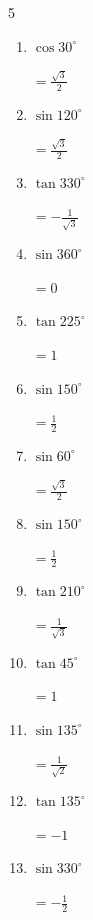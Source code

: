 \begin{multicols}{5}
\begin{enumerate}
  \item $\displaystyle \cos{30^\circ}$

        $\displaystyle =\frac{\sqrt{3}}{2}$

  \item $\displaystyle \sin{120^\circ}$

        $\displaystyle =\frac{\sqrt{3}}{2}$

  \item $\displaystyle \tan{330^\circ}$

        $\displaystyle =-\frac{1}{\sqrt{3}}$

  \item $\displaystyle \sin{360^\circ}$

        $\displaystyle =0$

  \item $\displaystyle \tan{225^\circ}$

        $\displaystyle =1$

\columnbreak %

  \item $\displaystyle \sin{150^\circ}$

        $\displaystyle =\frac{1}{2}$

  \item $\displaystyle \sin{60^\circ}$

        $\displaystyle =\frac{\sqrt{3}}{2}$

  \item $\displaystyle \sin{150^\circ}$

        $\displaystyle =\frac{1}{2}$

  \item $\displaystyle \tan{210^\circ}$

        $\displaystyle =\frac{1}{\sqrt{3}}$

  \item $\displaystyle \tan{45^\circ}$

        $\displaystyle =1$

  \item $\displaystyle \sin{135^\circ}$

        $\displaystyle =\frac{1}{\sqrt{2}}$

  \item $\displaystyle \tan{135^\circ}$

        $\displaystyle =-1$

  \item $\displaystyle \sin{330^\circ}$

        $\displaystyle =-\frac{1}{2}$


\end{enumerate}
\end{multicols}
